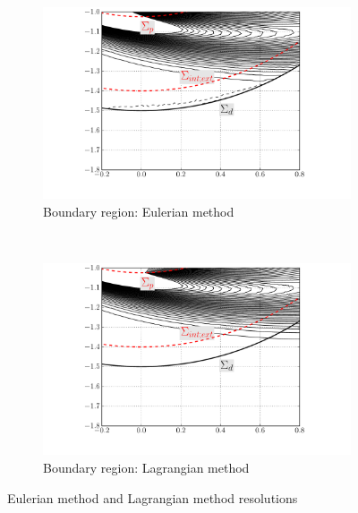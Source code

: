 \begin{figure}[!p]
     \begin{subfigure}[t]{0.49\textwidth}
             \includegraphics[width=\textwidth]{./figures/hybrid/isc/hisc_EulerianDomain_bdry.pdf}
             \caption{Boundary region: Eulerian method}
             \label{fig:hisc_EulerianDomain_bdry}
     \end{subfigure}%
     ~ %
     \begin{subfigure}[t]{0.49\textwidth}
             \includegraphics[width=\textwidth]{./figures/hybrid/isc/hisc_LagrangianDomain_bdry.pdf}
             \caption{Boundary region: Lagrangian method}
             \label{fig:hisc_LagrangianDomain_bdry}
     \end{subfigure}     
     \caption{Eulerian method and Lagrangian method resolutions}
     \label{fig:hisc_EulerianVsLagrangian}
	\end{figure}


